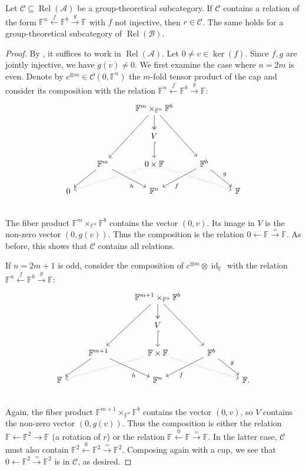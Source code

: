 \documentclass[11pt]{amsart}
\newcommand\Cref[1]{\zcref[S]{#1}}
\theoremstyle{definition}
\theoremstyle{remark}
\newcommand\cA{\mathcal A}
\newcommand\cB{\mathcal B}
\newcommand\cC{\mathcal C}
\newcommand\id{\operatorname{id}}
\renewcommand\:\colon
\renewcommand\o\otimes
\newcommand\FF{\mathbb F}
\renewcommand\o\otimes
\renewcommand\:\colon
\newcommand\Rel{\operatorname{Rel}}
\begin{document}
\begin{lemma} \label{l:single-bottom-contains-r}
    Let $\cC \subseteq \Rel(\cA)$ be a group-theoretical subcategory. If $\cC$ contains a relation of the form $\FF^n \xleftarrow{f} \FF^b \xrightarrow{g} \FF$ with $f$ not injective, then $r \in \cC$. The same holds for a group-theoretical subcategory of $\Rel(\cB)$.
\end{lemma}
\begin{proof}
    By \Cref{l:bijection-rela-relb}, it suffices to work in $\Rel(\cA)$.
    Let $0 \ne v \in \ker(f)$. Since $f, g$ are jointly injective, we have $g(v) \ne 0$. We first examine the case where $n = 2m$ is even. Denote by $c^{\o m} \in \cC(0, \FF^n)$ the $m$-fold tensor product of the cap and consider its composition with the relation $\FF^n \xleftarrow{f} \FF^b \xrightarrow{g} \FF$:
    \[\begin{tikzcd}
        && \FF^m \times_{\FF^n} \FF^b \arrow{ldd} \arrow{rdd} \arrow[two heads]{d} && \\
        && V \arrow[hook]{d} && \\
        & \FF^m \arrow{ld} \arrow[pos=.7,swap]{rd}{h} & 0 \times \FF \arrow[dotted]{lld}\arrow[dotted]{rrd} & \FF^b \arrow[pos=.7]{ld}{f} \arrow{rd}{g} & \\
        0 && \FF^n && \FF \\
    \end{tikzcd}\]
    The fiber product $\FF^m \times_{\FF^n} \FF^b$ contains the vector $(0, v)$. Its image in $V$ is the non-zero vector $(0, g(v))$. Thus the composition is the relation $0 \leftarrow \FF \xrightarrow{=} \FF$. As before, this shows that $\cC$ contains all relations.

    If $n = 2m+1$ is odd, consider the composition of $c^{\o m} \o \id_{\FF}$ with the relation $\FF^n \xleftarrow{f} \FF^b \xrightarrow{g} \FF$:
    \[\begin{tikzcd}
        && \FF^{m+1} \times_{\FF^n} \FF^b \arrow{ldd} \arrow{rdd} \arrow[two heads]{d} && \\
        && V \arrow[hook]{d} && \\
        & \FF^{m+1} \arrow{ld} \arrow[pos=.7,swap]{rd}{h} & \FF \times \FF \arrow[dotted]{lld}\arrow[dotted]{rrd} & \FF^b \arrow[pos=.7]{ld}{f} \arrow{rd}{g} & \\
        \FF && \FF^n && \FF. \\
    \end{tikzcd}\]
    Again, the fiber product $\FF^{m+1} \times_{\FF^n} \FF^b$ contains the vector $(0, v)$, so $V$ contains the non-zero vector $(0, g(v))$. Thus the composition is either the relation $\FF \leftarrow \FF^2 \rightarrow \FF$ (a rotation of $r$) or the relation $\FF \xleftarrow{0} \FF \xrightarrow{=} \FF$. In the latter case, $\cC$ must also contain $\FF^2 \xleftarrow{0} \FF^2 \xrightarrow{=} \FF^2$. Composing again with a cup, we see that $0 \leftarrow \FF^2 \xrightarrow{=} \FF^2$ is in $\cC$, as desired.
\end{proof}
\end{document}
